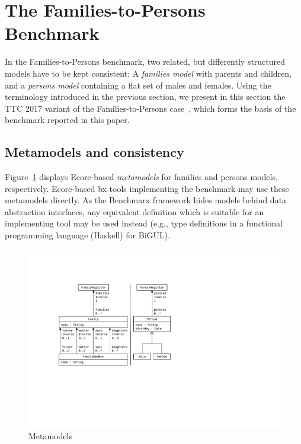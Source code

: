 

\section{The Families-to-Persons Benchmark}
\label{sec:FamiliesToPersons}



In the Families-to-Persons benchmark, two related, but differently structured models have to be kept consistent: A \emph{families model} with parents and children, and a \emph{persons model} containing a flat set of males and females. 
Using the terminology introduced in the previous section, we present in this section the TTC 2017 variant of the Families-to-Persons case~\cite{Anjorin2017a,ENASE2018-Westfechtel}, which forms the basis of the benchmark reported in this paper. 

\subsection{Metamodels and consistency}
\label{sec:MetamodelsAndConsistency}

Figure~\ref{fig:metamodels} displays Ecore-based \emph{metamodels} for families and persons models, respectively.
Ecore-based bx tools implementing the benchmark may use these metamodels directly.
As the Benchmarx framework hides models behind data abstraction interfaces, any equivalent definition which is suitable for an implementing tool may be used instead (e.g., type definitions in a functional programming language (Haskell) for BiGUL).

\begin{figure}[tb!]
	\centering
	\includegraphics[width=\columnwidth]{diagrams/f2p-case/Metamodels}
	\caption{Metamodels}
	\label{fig:metamodels}
\end{figure}

